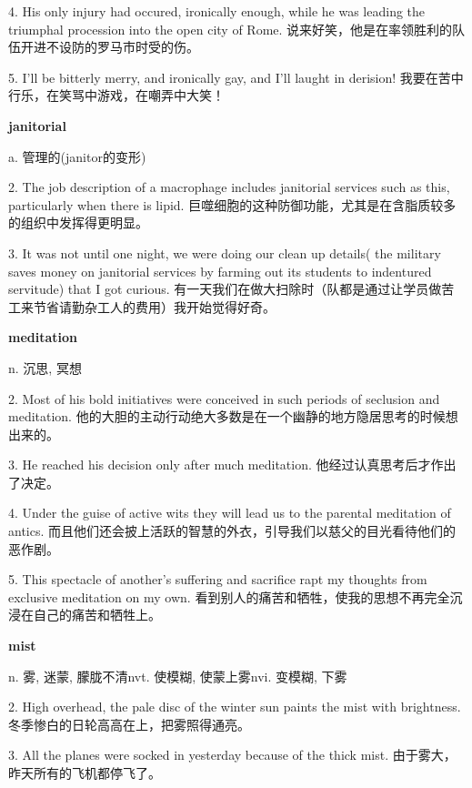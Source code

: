 \documentclass[12pt]{book}
\begin{document}
4.  His only injury had occured, ironically enough, while he was leading the triumphal procession into the open city of Rome.  说来好笑，他是在率领胜利的队伍开进不设防的罗马市时受的伤。 


5.  I'll be bitterly merry, and ironically gay, and I'll laught in derision!  我要在苦中行乐，在笑骂中游戏，在嘲弄中大笑！ 


\vspace{12pt}

\textbf{janitorial}

a. 管理的(janitor的变形)

2.  The job description of a macrophage includes janitorial services such as this, particularly when there is lipid.  巨噬细胞的这种防御功能，尤其是在含脂质较多的组织中发挥得更明显。 


3.  It was not until one night, we were doing our clean up details( the military saves money on janitorial services by farming out its students to indentured servitude) that I got curious.  有一天我们在做大扫除时（队都是通过让学员做苦工来节省请勤杂工人的费用）我开始觉得好奇。 


\vspace{12pt}

\textbf{meditation}

n. 沉思, 冥想

2.  Most of his bold initiatives were conceived in such periods of seclusion and meditation.  他的大胆的主动行动绝大多数是在一个幽静的地方隐居思考的时候想出来的。 


3.  He reached his decision only after much meditation.  他经过认真思考后才作出了决定。 


4.  Under the guise of active wits they will lead us to the parental meditation of antics.  而且他们还会披上活跃的智慧的外衣，引导我们以慈父的目光看待他们的恶作剧。 


5.  This spectacle of another's suffering and sacrifice rapt my thoughts from exclusive meditation on my own.  看到别人的痛苦和牺牲，使我的思想不再完全沉浸在自己的痛苦和牺牲上。 


\vspace{12pt}

\textbf{mist}

n. 雾, 迷蒙, 朦胧不清nvt. 使模糊, 使蒙上雾nvi. 变模糊, 下雾

2.  High overhead, the pale disc of the winter sun paints the mist with brightness.  冬季惨白的日轮高高在上，把雾照得通亮。 


3.  All the planes were socked in yesterday because of the thick mist.  由于雾大，昨天所有的飞机都停飞了。 
\end{document}
